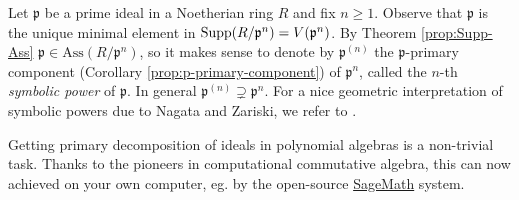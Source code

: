 \begin{example}
	Let $\mathfrak{p}$ be a prime ideal in a Noetherian ring $R$ and fix $n \geq 1$. Observe that $\mathfrak{p}$ is the unique minimal element in $\operatorname{Supp}(R/\mathfrak{p}^n) = V(\mathfrak{p}^n)$. By Theorem \ref{prop:Supp-Ass} $\mathfrak{p} \in \text{Ass}(R/\mathfrak{p}^n)$, so it makes sense to denote by $\mathfrak{p}^{(n)}$ the $\mathfrak{p}$-primary component (Corollary \ref{prop:p-primary-component}) of $\mathfrak{p}^n$, called the $n$-th \emph{symbolic power} of $\mathfrak{p}$. In general $\mathfrak{p}^{(n)} \supsetneq \mathfrak{p}^n$. For a nice geometric interpretation of symbolic powers due to Nagata and Zariski, we refer to \cite[\S 3.9]{Eis95}.
\end{example}

Getting primary decomposition of ideals in polynomial algebras is a non-trivial task. Thanks to the pioneers in computational commutative algebra, this can now achieved on your own computer, eg. by the open-source \href{http://www.sagemath.org}{SageMath} system.